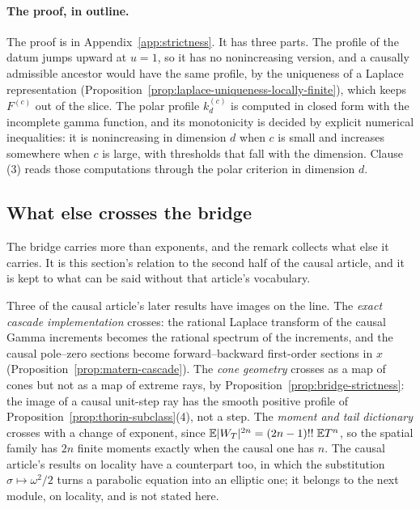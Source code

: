 \paragraph{The proof, in outline.} The proof is in Appendix~\ref{app:strictness}. It has three
parts. The profile of the datum jumps upward at $u = 1$, so it has no nonincreasing version, and
a causally admissible ancestor would have the same profile, by the uniqueness of a Laplace
representation (Proposition~\ref{prop:laplace-uniqueness-locally-finite}), which keeps
$F^{(c)}$ out of the slice. The polar profile $k^{(c)}_d$ is computed in closed form with the incomplete gamma
function, and its monotonicity is decided by explicit numerical inequalities: it is
nonincreasing in dimension $d$ when $c$ is small and increases somewhere when $c$ is large,
with thresholds that fall with the dimension. Clause (3) reads those computations through the
polar criterion in dimension $d$.

\subsection{What else crosses the bridge}\label{sec:crossings}

The bridge carries more than exponents, and the remark collects what else it carries. It is
this section's relation to the second half of the causal article, and it is kept to what can
be said without that article's vocabulary.

\begin{remark}\label{rem:bridge-crossings}
Three of the causal article's later results have images on the line. The \emph{exact
cascade implementation} crosses: the rational Laplace transform of the causal Gamma increments
becomes the rational spectrum of the \Matern{} increments, and the causal pole--zero sections
become forward--backward first-order sections in $x$ (Proposition~\ref{prop:matern-cascade}).
The \emph{cone geometry} crosses as a map of cones but not as a map of extreme rays, by
Proposition~\ref{prop:bridge-strictness}: the image of a causal unit-step ray has the smooth
positive profile of Proposition~\ref{prop:thorin-subclass}(4), not a step. The \emph{moment and
tail dictionary} crosses with a change of exponent, since
$\mathbb{E}|W_T|^{2n} = (2n-1)!!\;\mathbb{E}T^n$, so the spatial family has $2n$ finite moments
exactly when the causal one has $n$. The causal article's results on locality have a
counterpart too, in which the substitution $\sigma \mapsto \omega^2/2$ turns a parabolic
equation into an elliptic one; it belongs to the next module, on locality, and is not stated
here.
\end{remark}
